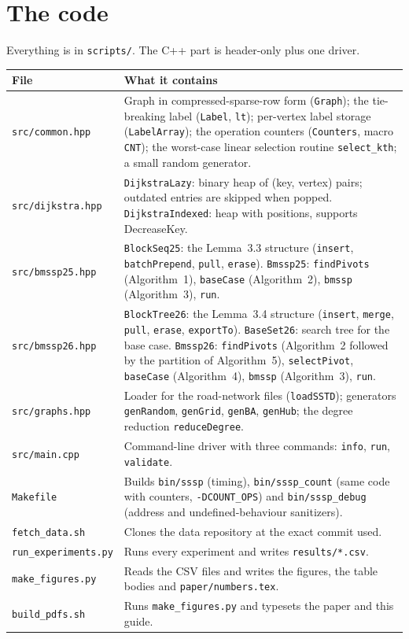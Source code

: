 \documentclass[11pt,a4paper]{article}
\newcommand{\code}[1]{\texttt{#1}}
\begin{document}
\section{The code}\label{sec:code}
Everything is in \code{scripts/}. The C++ part is header-only plus one driver.

\begin{longtable}{@{}p{3.6cm}p{11.6cm}@{}}
\toprule
File & What it contains\\
\midrule
\code{src/common.hpp} & Graph in compressed-sparse-row form (\code{Graph}); the tie-breaking label (\code{Label}, \code{lt}); per-vertex label storage (\code{LabelArray}); the operation counters (\code{Counters}, macro \code{CNT}); the worst-case linear selection routine \code{select\_kth}; a small random generator.\\
\code{src/dijkstra.hpp} & \code{DijkstraLazy}: binary heap of (key, vertex) pairs; outdated entries are skipped when popped. \code{DijkstraIndexed}: heap with positions, supports DecreaseKey.\\
\code{src/bmssp25.hpp} & \code{BlockSeq25}: the Lemma~3.3 structure (\code{insert}, \code{batchPrepend}, \code{pull}, \code{erase}). \code{Bmssp25}: \code{findPivots} (Algorithm~1), \code{baseCase} (Algorithm~2), \code{bmssp} (Algorithm~3), \code{run}.\\
\code{src/bmssp26.hpp} & \code{BlockTree26}: the Lemma~3.4 structure (\code{insert}, \code{merge}, \code{pull}, \code{erase}, \code{exportTo}). \code{BaseSet26}: search tree for the base case. \code{Bmssp26}: \code{findPivots} (Algorithm~2 followed by the partition of Algorithm~5), \code{selectPivot}, \code{baseCase} (Algorithm~4), \code{bmssp} (Algorithm~3), \code{run}.\\
\code{src/graphs.hpp} & Loader for the road-network files (\code{loadSSTD}); generators \code{genRandom}, \code{genGrid}, \code{genBA}, \code{genHub}; the degree reduction \code{reduceDegree}.\\
\code{src/main.cpp} & Command-line driver with three commands: \code{info}, \code{run}, \code{validate}.\\
\code{Makefile} & Builds \code{bin/sssp} (timing), \code{bin/sssp\_count} (same code with counters, \code{-DCOUNT\_OPS}) and \code{bin/sssp\_debug} (address and undefined-behaviour sanitizers).\\
\code{fetch\_data.sh} & Clones the data repository at the exact commit used.\\
\code{run\_experiments.py} & Runs every experiment and writes \code{results/*.csv}.\\
\code{make\_figures.py} & Reads the CSV files and writes the figures, the table bodies and \code{paper/numbers.tex}.\\
\code{build\_pdfs.sh} & Runs \code{make\_figures.py} and typesets the paper and this guide.\\
\bottomrule
\end{longtable}
\end{document}
